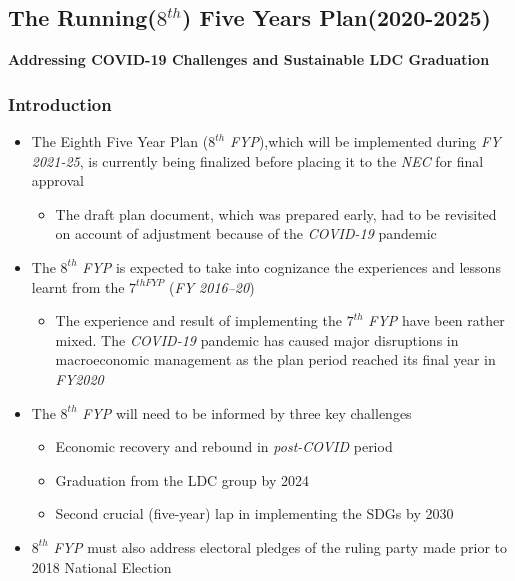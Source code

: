 \newpage
\subsection{The Running($8^{th}$) Five Years Plan(2020-2025)}
\textbf{Addressing COVID-19 Challenges and Sustainable LDC Graduation}
\subsubsection{Introduction}
\begin{itemize}
	\item The Eighth Five Year Plan ($8^{th}$ \textit{FYP}),which will be implemented during 
	\textit{FY 2021-25}, is currently being finalized before placing it to the \textit{NEC} for final approval
	\begin{itemize}
		\item The draft plan document, which was prepared early, had to be revisited on account 
		of adjustment because of the \textit{COVID-19} pandemic
	\end{itemize}
	
	\item The $8^{th}$ \textit{FYP} is expected to take into cognizance the experiences and lessons 
	learnt from the $7^{th FYP}$ (\textit{FY 2016–20})
	\begin{itemize}
		\item The experience and result of implementing the $7^{th}$ \textit{FYP} have been rather mixed. 
		The \textit{COVID-19} pandemic has caused major disruptions in macroeconomic management as 
		the plan period reached its final year in \textit{FY2020}
	\end{itemize}
	
	\item The $8^{th}$ \textit{FYP} will need to be informed by three key challenges
	\begin{itemize}
		\item Economic recovery and rebound in \textit{post-COVID} period
		\item Graduation from the LDC group by 2024
		\item Second crucial (five-year) lap in implementing the SDGs by 2030
	\end{itemize}
	
	\item $8^{th}$ \textit{FYP} must also address electoral pledges of the ruling 
	party made prior to 2018 National Election
	
\end{itemize}


